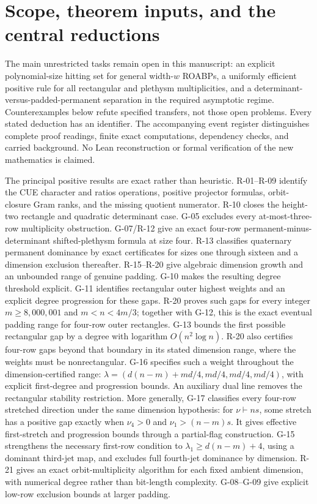 \section{Scope, theorem inputs, and the central reductions}

The main unrestricted tasks remain open in this manuscript: an explicit polynomial-size hitting set for general width-$w$ ROABPs, a uniformly efficient positive rule for all rectangular and plethysm multiplicities, and a determinant-versus-padded-permanent separation in the required asymptotic regime. Counterexamples below refute specified transfers, not those open problems. Every stated deduction has an identifier. The accompanying event register distinguishes complete proof readings, finite exact computations, dependency checks, and carried background. No Lean reconstruction or formal verification of the new mathematics is claimed.

The principal positive results are exact rather than heuristic. R-01--R-09 identify the CUE character and ratios operations, positive projector formulas, orbit-closure Gram ranks, and the missing quotient numerator. R-10 closes the height-two rectangle and quadratic determinant case. G-05 excludes every at-most-three-row multiplicity obstruction. G-07/R-12 give an exact four-row permanent-minus-determinant shifted-plethysm formula at size four. R-13 classifies quaternary permanent dominance by exact certificates for sizes one through sixteen and a dimension exclusion thereafter. R-15--R-20 give algebraic dimension growth and an unbounded range of genuine padding. G-10 makes the resulting degree threshold explicit. G-11 identifies rectangular outer highest weights and an explicit degree progression for these gaps. R-20 proves such gaps for every integer $m\geq8{,}000{,}001$ and $m<n<4m/3$; together with G-12, this is the exact eventual padding range for four-row outer rectangles. G-13 bounds the first possible rectangular gap by a degree with logarithm $O(n^2\log n)$. R-20 also certifies four-row gaps beyond that boundary in its stated dimension range, where the weights must be nonrectangular. G-16 specifies such a weight throughout the dimension-certified range: $\lambda=(d(n-m)+md/4,md/4,md/4,md/4)$, with explicit first-degree and progression bounds. An auxiliary dual line removes the rectangular stability restriction. More generally, G-17 classifies every four-row stretched direction under the same dimension hypothesis: for $\nu\vdash ns$, some stretch has a positive gap exactly when $\nu_4>0$ and $\nu_1>(n-m)s$. It gives effective first-stretch and progression bounds through a partial-flag construction. G-15 strengthens the necessary first-row condition to $\lambda_1\geq d(n-m)+4$, using a dominant third-jet map, and excludes full fourth-jet dominance by dimension. R-21 gives an exact orbit-multiplicity algorithm for each fixed ambient dimension, with numerical degree rather than bit-length complexity. G-08--G-09 give explicit low-row exclusion bounds at larger padding.

